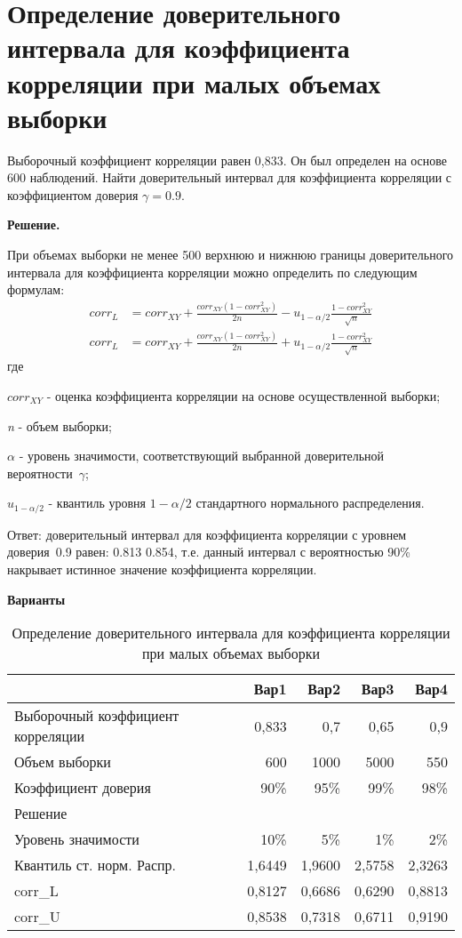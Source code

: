 \documentclass[12pt,a4paper]{article}
\begin{document}
\section{Определение доверительного интервала для коэффициента корреляции при малых объемах выборки}
\begin{taskrus}
Выборочный коэффициент корреляции равен 0,833. Он был определен на основе 600 наблюдений. Найти доверительный интервал для коэффициента корреляции с коэффициентом доверия $\gamma=0.9$.

\textbf{Решение.}

При объемах выборки не менее 500 верхнюю и нижнюю границы доверительного интервала для коэффициента корреляции можно определить по следующим формулам:
\begin{align}
corr_L&=corr_{XY}+\frac{corr_{XY}(1-corr_{XY}^2)}{2n}-u_{1-\alpha/2}\frac{1-corr_{XY}^2}{\sqrt{n}}\\
corr_L&=corr_{XY}+\frac{corr_{XY}(1-corr_{XY}^2)}{2n}+u_{1-\alpha/2}\frac{1-corr_{XY}^2}{\sqrt{n}}
\end{align}
где

$corr_{XY}$ - оценка коэффициента корреляции на основе осуществленной выборки;

\textit{n} - объем выборки;

$\alpha$ - уровень значимости, соответствующий выбранной доверительной вероятности~$\gamma$;

$u_{1-\alpha/2}$ - квантиль уровня $1-\alpha/2$ стандартного нормального распределения.


Ответ: доверительный интервал для коэффициента корреляции с уровнем доверия~0.9 равен: 0.813 0.854, т.е. данный интервал с вероятностью 90\% накрывает истинное значение коэффициента корреляции.

\textbf{Варианты}

\begin{table}[H]
  \centering
  \caption{Определение доверительного интервала для коэффициента корреляции при малых объемах выборки}
    \begin{tabular}{lrrrr}
    \toprule
          & Вар1  & Вар2  & Вар3  & Вар4 \\
    \midrule
    Выборочный коэффициент корреляции & 0,833 & 0,7   & 0,65  & 0,9 \\
    Объем выборки & 600   & 1000  & 5000  & 550 \\
    Коэффициент доверия & 90\%  & 95\%  & 99\%  & 98\% \\
    Решение &       &       &       &  \\
    Уровень значимости & 10\%  & 5\%   & 1\%   & 2\% \\
    Квантиль ст. норм. Распр. & 1,6449 & 1,9600 & 2,5758 & 2,3263 \\
    corr\_L & 0,8127 & 0,6686 & 0,6290 & 0,8813 \\
    corr\_U & 0,8538 & 0,7318 & 0,6711 & 0,9190 \\
    \bottomrule
    \end{tabular}%
  \label{tab:addlabel}%
\end{table}%

\end{taskrus}
\end{document}
